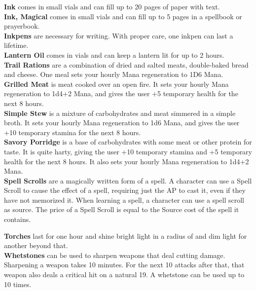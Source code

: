 \textbf{Ink} comes in small vials and can fill up to 20 pages of paper with text.\\

\textbf{Ink, Magical} comes in small vials and can fill up to 5 pages in a spellbook or prayerbook.\\

\textbf{Inkpens} are necessary for writing.
With proper care, one inkpen can last a lifetime.\\

\textbf{Lantern Oil} comes in vials and can keep a lantern lit for up to 2 hours.\\

\textbf{Trail Rations} are a combination of dried and salted meats, double-baked bread and cheese.
One meal sets your hourly Mana regeneration to 1D6 Mana.\\

\textbf{Grilled Meat} is meat cooked over an open fire.
It sets your hourly Mana regeneration to 1d4+2 Mana, and gives the user +5 temporary health for the next 8 hours.\\

\textbf{Simple Stew} is a mixture of carbohydrates and meat simmered in a simple broth.
It sets your hourly Mana regeneration to 1d6 Mana, and gives the user +10 temporary stamina for the next 8 hours.\\

\textbf{Savory Porridge} is a base of carbohydrates with some meat or other protein for taste.
It is quite harty, giving the user +10 temporary stamina and +5 temporary health for the next 8 hours.
It also sets your hourly Mana regeneration to 1d4+2 Mana.\\

\textbf{Spell Scrolls} are a magically written form of a spell.
A character can use a Spell Scroll to cause the effect of a spell, requiring just the AP to cast it, even if they have not memorized it.
When learning a spell, a character can use a spell scroll as source.
The price of a Spell Scroll is equal to the Source cost of the spell it contains.

\textbf{Torches} last for one hour and shine bright light in a radius of  and dim light for another  beyond that.\\

\textbf{Whetstones} can be used to sharpen weapons that deal cutting damage.
Sharpening a weapon takes 10 minutes.
For the next 10 attacks after that, that weapon also deals a critical hit on a natural 19.
A whetstone can be used up to 10 times.\\